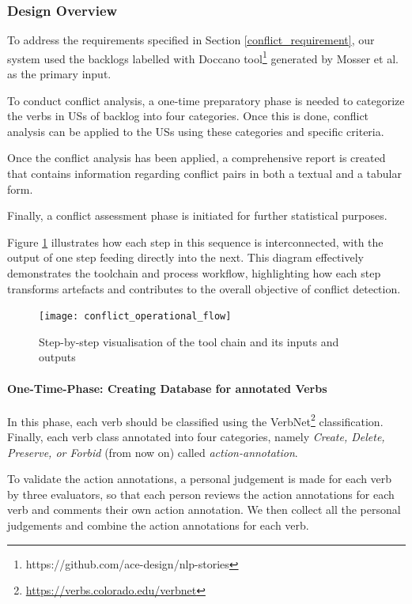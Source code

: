 \subsubsection*{Design Overview}
To address the requirements specified in Section \ref{conflict_requirement}, our system used the backlogs labelled with Doccano tool\footnote{https://github.com/ace-design/nlp-stories} generated by Mosser et al. as the primary input\cite{arulmohan2023extracting}.

To conduct conflict analysis, a one-time preparatory phase is needed to categorize the verbs in USs of backlog into four categories. Once this is done, conflict analysis can be applied to the USs using these categories and specific criteria.

Once the conflict analysis has been applied, a comprehensive report is created that contains information regarding conflict pairs in both a textual and a tabular form.

Finally, a conflict assessment phase is initiated for further statistical purposes.

Figure \ref{fig:conflict_operational_flow} illustrates how each step in this sequence is interconnected, with the output of one step feeding directly into the next. This diagram effectively demonstrates the toolchain and process workflow, highlighting how each step transforms artefacts and contributes to the overall objective of conflict detection.
\begin{figure}[h]
	\centering 
	\texttt{[image: conflict\_operational\_flow]}
	\caption{Step-by-step visualisation of the tool chain and its inputs and outputs}\label{fig:conflict_operational_flow}
\end{figure}
\paragraph{One-Time-Phase: Creating Database for annotated Verbs}In this phase, each verb should be classified using the VerbNet\footnote{\href{https://verbs.colorado.edu/verbnet}{https://verbs.colorado.edu/verbnet}} classification. Finally, each verb class annotated into four categories, namely \textit{Create, Delete, Preserve, or Forbid} (from now on) called \textit{action-annotation}. 

To validate the action annotations, a personal judgement is made for each verb by three evaluators, so that each person reviews the action annotations for each verb and comments their own action annotation. We then collect all the personal judgements and combine the action annotations for each verb.

